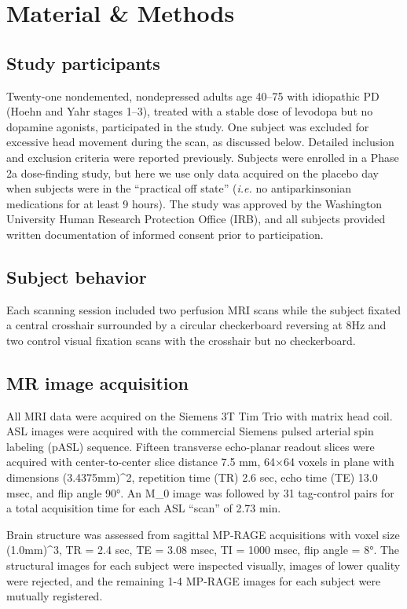 \section{Material \& Methods}

\subsection{Study participants}
Twenty-one nondemented, nondepressed adults age 40–75 with idiopathic PD (Hoehn and Yahr stages 1–3),\cite{6067254} treated with a stable dose of levodopa but no dopamine agonists, participated in the study. One subject was excluded for excessive head movement during the scan, as discussed below. Detailed inclusion and exclusion criteria were reported previously.\cite{SYN115_2010_AAN_RCT} Subjects were enrolled in a Phase 2a dose-finding study,\cite{Black_2010} but here we use only data acquired on the placebo day when subjects were in the ``practical off state'' (\textit{i.e.} no antiparkinsonian medications for at least 9 hours). The study was approved by the Washington University Human Research Protection Office (IRB), and all subjects provided written documentation of informed consent prior to participation.

\subsection{Subject behavior}
Each scanning session included two perfusion MRI scans while the subject fixated a central crosshair surrounded by a circular checkerboard reversing at 8Hz and two control visual fixation scans with the crosshair but no checkerboard. 

\subsection{MR image acquisition}
All MRI data were acquired on the Siemens 3T Tim Trio with matrix head coil. ASL images were acquired with the commercial Siemens pulsed arterial spin labeling (pASL) sequence.\cite{Wang_2003} Fifteen transverse echo-planar readout slices were acquired with center-to-center slice distance 7.5 mm, 64$\times$64 voxels in plane with dimensions (3.4375mm)^2, repetition time (TR) 2.6 sec, echo time (TE) 13.0 msec, and flip angle 90°. An M_0 image was followed by 31 tag-control pairs for a total acquisition time for each ASL ``scan'' of 2.73 min.

Brain structure was assessed from sagittal MP-RAGE acquisitions with voxel size (1.0mm)^3, TR = 2.4 sec, TE = 3.08 msec, TI = 1000 msec, flip angle = 8°. The structural images for each subject were inspected visually, images of lower quality were rejected, and the remaining 1-4 MP-RAGE images for each subject were mutually registered.

